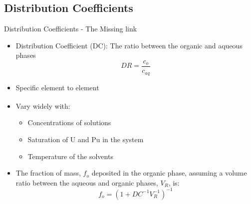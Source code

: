 \documentclass{beamer}
\newcommand{\tss}{\textsuperscript}
\begin{document}
\subsection{Distribution Coefficients}
\begin{frame}{Distribution Coefficients - The Missing link}
  \begin{itemize}
  \item{Distribution Coefficient (DC): The ratio between the organic
  and aqueous phases}
    \begin{equation*}
      DR=\frac{c_{o}}{c_{aq}}
    \end{equation*}
  \item{Specific element to element}
  \item{Vary widely with:\tss{\cite{stoller1961reactor}}}
    \begin{itemize}
    \item{Concentrations of solutions}
    \item{Saturation of U and Pu in the system}
    \item{Temperature of the solvents}
    \end{itemize}
  \item{The fraction of mass, $f_o$ deposited in the organic
    phase, assuming a volume ratio between
    the aqueous and organic phases, $V_R$, is:}
    \begin{equation*}
      f_o=(1+DC^{-1}V^{-1}_R)^{-1}
    \end{equation*}
  \end{itemize}
\end{frame}
\end{document}
